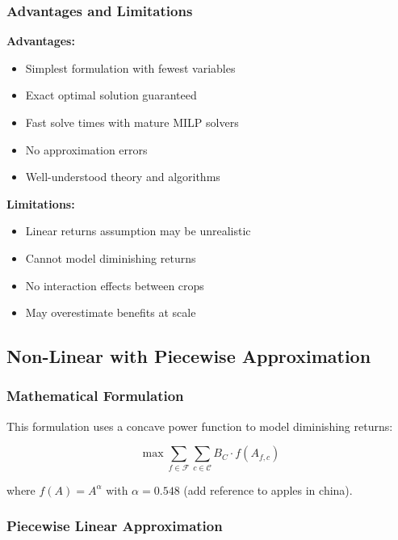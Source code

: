 \documentclass{article}
\begin{document}
\subsubsection{Advantages and Limitations}
\begin{multicols}{2}
    \textbf{Advantages:}
\begin{itemize}
    \item Simplest formulation with fewest variables
    \item Exact optimal solution guaranteed
    \item Fast solve times with mature MILP solvers
    \item No approximation errors
    \item Well-understood theory and algorithms
\end{itemize}

\columnbreak

\textbf{Limitations:}
\begin{itemize}
    \item Linear returns assumption may be unrealistic
    \item Cannot model diminishing returns
    \item No interaction effects between crops
    \item May overestimate benefits at scale
\end{itemize}

\end{multicols}


\newpage

\subsection{Non-Linear with Piecewise Approximation}

\subsubsection{Mathematical Formulation}

This formulation uses a concave power function to model diminishing returns:

\begin{equation}
\max \sum_{f \in \mathcal{F}} \sum_{c \in \mathcal{C}} B_C \cdot f(A_{f,c})
\label{eq:nonlinear_obj}
\end{equation}

where $f(A) = A^\alpha$ with $\alpha = 0.548$ (add reference to apples in china).

\subsubsection{Piecewise Linear Approximation}
\end{document}
